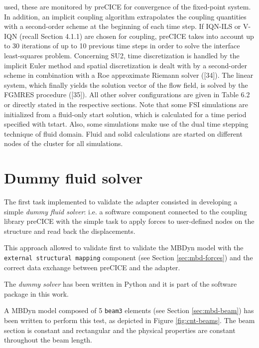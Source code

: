 used, these are monitored by preCICE for convergence of the fixed-point system. In addition, an implicit
coupling algorithm extrapolates the coupling quantities with a second-order scheme at the beginning of
each time step. If IQN-ILS or V-IQN (recall Section 4.1.1) are chosen for coupling, preCICE takes into
account up to 30 iterations of up to 10 previous time steps in order to solve the interface least-squares
problem.
Concerning SU2, time discretization is handled by the implicit Euler method and spatial discretization is
dealt with by a second-order scheme in combination with a Roe approximate Riemann solver ([34]). The
linear system, which finally yields the solution vector of the flow field, is solved by the FGMRES procedure
([35]). All other solver configurations are given in Table 6.2 or directly stated in the respective sections.
Note that some FSI simulations are initialized from a fluid-only start solution, which is calculated for a
time period specified with tstart. Also, some simulations make use of the dual time stepping technique of
fluid domain.
Fluid and solid calculations are started on different nodes of the cluster for all simulations.



\section{Dummy fluid solver}

The first task implemented to validate the adapter consisted in developing a simple \textit{dummy fluid solver}: i.e. a software component connected to the coupling library preCICE with the simple task to apply forces to user-defined nodes on the structure and read back the displacements.

This approach allowed to validate first to validate the MBDyn model with the \texttt{external structural mapping} component (see Section \ref{sec:mbd-forces}) and the correct data exchange between preCICE and the adapter. 

The \textit{dummy solver} has been written in Python and it is part of the software package in this work.

A MBDyn model composed of 5 \texttt{beam3} elements (see Section \ref{sec:mbd-beam}) has been written to perform this test, as depicted in Figure \ref{fig:cnt-beams}. The beam section is constant and rectangular and the physical properties are constant throughout the beam length. 

